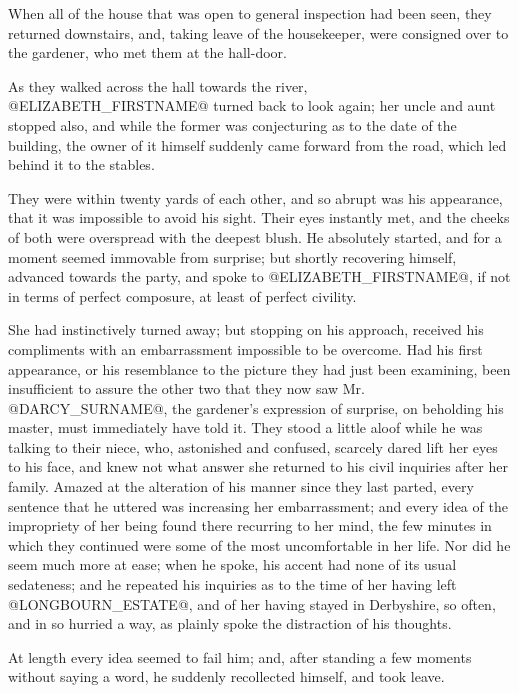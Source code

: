 When all of the house that was open to general inspection had been seen,
they returned downstairs, and, taking leave of the housekeeper, were
consigned over to the gardener, who met them at the hall-door.

As they walked across the hall towards the river, @ELIZABETH_FIRSTNAME@ turned back
to look again; her uncle and aunt stopped also, and while the former
was conjecturing as to the date of the building, the owner of it himself
suddenly came forward from the road, which led behind it to the stables.

They were within twenty yards of each other, and so abrupt was his
appearance, that it was impossible to avoid his sight. Their eyes
instantly met, and the cheeks of both were overspread with the deepest
blush. He absolutely started, and for a moment seemed immovable from
surprise; but shortly recovering himself, advanced towards the party,
and spoke to @ELIZABETH_FIRSTNAME@, if not in terms of perfect composure, at least
of perfect civility.

She had instinctively turned away; but stopping on his approach,
received his compliments with an embarrassment impossible to be
overcome. Had his first appearance, or his resemblance to the picture
they had just been examining, been insufficient to assure the other two
that they now saw Mr. @DARCY_SURNAME@, the gardener's expression of surprise, on
beholding his master, must immediately have told it. They stood a little
aloof while he was talking to their niece, who, astonished and confused,
scarcely dared lift her eyes to his face, and knew not what answer
she returned to his civil inquiries after her family. Amazed at the
alteration of his manner since they last parted, every sentence that
he uttered was increasing her embarrassment; and every idea of the
impropriety of her being found there recurring to her mind, the few
minutes in which they continued were some of the most uncomfortable in
her life. Nor did he seem much more at ease; when he spoke, his accent
had none of its usual sedateness; and he repeated his inquiries as
to the time of her having left @LONGBOURN_ESTATE@, and of her having stayed in
Derbyshire, so often, and in so hurried a way, as plainly spoke the
distraction of his thoughts.

At length every idea seemed to fail him; and, after standing a few
moments without saying a word, he suddenly recollected himself, and took
leave.

